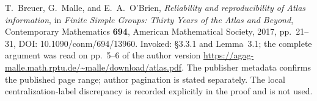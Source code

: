 T.~Breuer, G.~Malle, and E.~A.~O'Brien,
\emph{Reliability and reproducibility of Atlas information},
in \emph{Finite Simple Groups: Thirty Years of the Atlas and Beyond},
Contemporary Mathematics \textbf{694}, American Mathematical Society,
2017, pp.~21--31, DOI: 10.1090/conm/694/13960.
Invoked: \S3.3.1 and Lemma~3.1; the complete argument was read on
pp.~5--6 of the author version
\url{https://agag-malle.math.rptu.de/~malle/download/atlas.pdf}.
The publisher metadata confirms the published page range; author
pagination is stated separately.  The local centralization-label
discrepancy is recorded explicitly in the proof and is not used.
